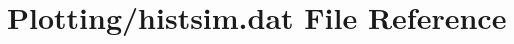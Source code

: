 \hypertarget{Plotting_2histsim_8dat}{}\section{Plotting/histsim.dat File Reference}
\label{Plotting_2histsim_8dat}
